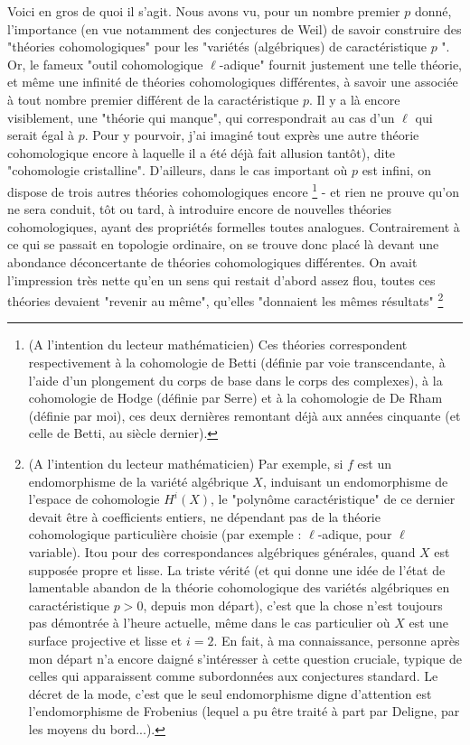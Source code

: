 Voici en gros de quoi il s'agit. Nous avons vu, pour un nombre premier $p$ donné, l'importance (en vue notamment des conjectures de Weil) de savoir construire des "théories cohomologiques" pour les "variétés (algébriques) de caractéristique $p$ ". Or, le fameux "outil cohomologique $\ell$-adique" fournit justement une telle théorie, et même une infinité de théories cohomologiques différentes, à savoir une associée à tout nombre premier différent de la caractéristique $p$. Il y a là encore visiblement, une "théorie qui manque", qui correspondrait au cas d'un $\ell$ qui serait égal à $p$. Pour y pourvoir, j'ai imaginé tout exprès une autre théorie cohomologique encore à laquelle il a été déjà fait allusion tantôt), dite "cohomologie cristalline". D'ailleurs, dans le cas important où $p$ est infini, on dispose de trois autres théories cohomologiques encore \footnote{(A l’intention du lecteur mathématicien) Ces théories correspondent respectivement à la cohomologie de Betti (définie par voie transcendante, à l'aide d'un plongement du corps de base dans le corps des complexes), à la cohomologie de Hodge (définie par Serre) et à la cohomologie de De Rham (définie par moi), ces deux dernières remontant déjà aux années cinquante (et celle de Betti, au siècle dernier).} - et rien ne prouve qu'on ne sera conduit, tôt ou tard, à introduire encore de nouvelles théories cohomologiques, ayant des propriétés formelles toutes analogues. Contrairement à ce qui se passait en topologie ordinaire, on se trouve donc placé là devant une abondance déconcertante de théories cohomologiques différentes. On avait l'impression très nette qu'en un sens qui restait d'abord assez flou, toutes ces théories devaient "revenir au même", qu'elles "donnaient les mêmes résultats" \footnote{(A l'intention du lecteur mathématicien) Par exemple, si $f$ est un endomorphisme de la variété algébrique $X$, induisant un endomorphisme de l'espace de cohomologie $H^{i}(X)$, le "polynôme caractéristique" de ce dernier devait être à coefficients entiers, ne dépendant pas de la théorie cohomologique particulière choisie (par exemple : $\ell$-adique, pour $\ell$ variable). Itou pour des correspondances algébriques générales, quand $X$ est supposée propre et lisse. La triste vérité (et qui donne une idée de l'état de lamentable abandon de la théorie cohomologique des variétés algébriques en caractéristique $p>0$, depuis mon départ), c'est que la chose n'est toujours pas démontrée à l'heure actuelle, même dans le cas particulier où $X$ est une surface projective et lisse et $i=2$. En fait, à ma connaissance, personne après mon départ n'a encore daigné s'intéresser à cette question cruciale, typique de celles qui apparaissent comme subordonnées aux conjectures standard. Le décret de la mode, c'est que le seul endomorphisme digne d'attention est l'endomorphisme de Frobenius (lequel a pu être traité à part par Deligne, par les moyens du bord...).
}
